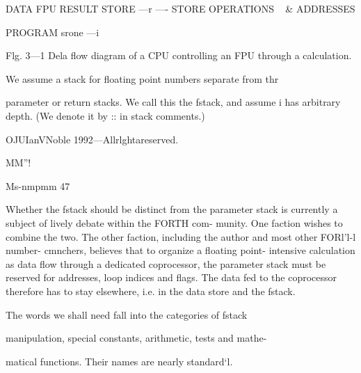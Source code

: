  

 

 

 

 

 

 

 

 

 

 

 

 

 

DATA FPU RESULT
STORE —r —- STORE
OPERATIONS
~ &
ADDRESSES

 

 

 

 

PROGRAM
srone —i

 

 

 

 

 

Flg. 3—1 Dela flow diagram of a CPU controlling an FPU through a
calculation.

We assume a stack for ﬂoating point numbers separate from thr

parameter or return stacks. We call this the fstack, and assume i
has arbitrary depth. (We denote it by :: in stack comments.)

OJUIanVNoble 1992—Allrlghtareserved.

MM”!

 

Ms-nmpmm 47

Whether the fstack should be distinct from the parameter stack
is currently a subject of lively debate within the FORTH com-
munity. One faction wishes to combine the two. The other
faction, including the author and most other FORl'l-l number-
cmnchers, believes that to organize a ﬂoating point- intensive
calculation as data ﬂow through a dedicated coprocessor, the
parameter stack must be reserved for addresses, loop indices and
ﬂags. The data fed to the coprocessor therefore has to stay
elsewhere, i.e. in the data store and the fstack.

The words we shall need fall into the categories of fstack

manipulation, special constants, arithmetic, tests and mathe-

matical functions. Their names are nearly standard‘l.

